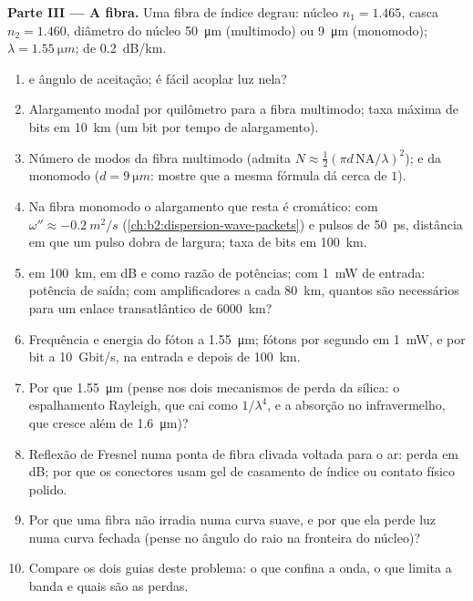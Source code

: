 \begin{problem}
\medskip
\noindent\textbf{Parte III --- A fibra.}
Uma fibra de índice degrau: núcleo $n_1 = 1.465$, casca $n_2 = 1.460$, diâmetro
do núcleo \qty{50}{\micro m} (multimodo) ou \qty{9}{\micro m} (monomodo);
$\lambda = \qty{1.55}{\micro m}$;  de \qty{0.2}{dB/km}.
\begin{enumerate}[resume]
  \item {} e ângulo de aceitação; é fácil acoplar
        luz nela?
  \item Alargamento modal por quilômetro para a fibra multimodo; taxa máxima
        de bits em \qty{10}{km} (um bit por tempo de alargamento).
  \item Número de modos da fibra multimodo (admita $N \approx
        \tfrac12(\pi d\,\mathrm{NA}/\lambda)^2$); e da monomodo ($d =
        \qty{9}{\micro m}$: mostre que a mesma fórmula dá cerca de $1$).
  \item Na fibra monomodo o alargamento que resta é cromático:
        com $\omega'' \approx \qty{-0.2}{m^2/s}$ (\cref{ch:b2:dispersion-wave-packets})
        e pulsos de \qty{50}{ps}, distância em que um pulso dobra de largura;
        taxa de bits em \qty{100}{km}.
  \item {} em \qty{100}{km}, em dB e como razão de potências; com
        \qty{1}{mW} de entrada: potência de saída; com amplificadores a cada \qty{80}{km},
        quantos são necessários para um enlace transatlântico de \qty{6000}{km}?
  \item Frequência e energia do fóton a \qty{1.55}{\micro m}; fótons por
        segundo em \qty{1}{mW}, e por bit a \qty{10}{Gbit/s}, na entrada
        e depois de \qty{100}{km}.
  \item Por que \qty{1.55}{\micro m} (pense nos dois mecanismos de perda da
        sílica: o espalhamento Rayleigh, que cai como $1/\lambda^4$, e a absorção
        no infravermelho, que cresce além de \qty{1.6}{\micro m})?
  \item Reflexão de Fresnel numa ponta de fibra clivada voltada para o ar: perda em
        dB; por que os conectores usam gel de casamento de índice ou contato
        físico polido.
  \item Por que uma fibra não irradia numa curva suave, e por que
        ela perde luz numa curva fechada (pense no ângulo do raio
        na fronteira do núcleo)?
  \item Compare os dois guias deste problema: o que confina a
        onda, o que limita a banda e quais são as perdas.
\end{enumerate}
\end{problem}
